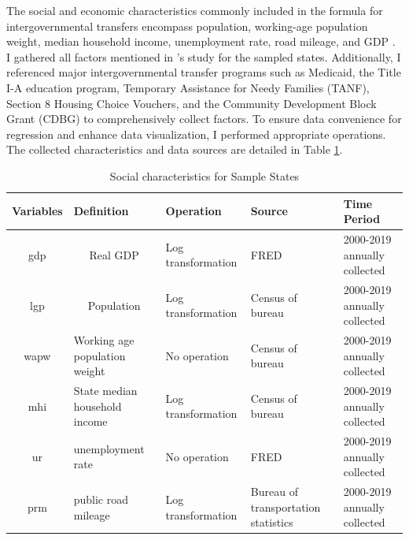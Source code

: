 \documentclass[man]{apa7}
\begin{document}
The social and economic characteristics commonly included in the formula for intergovernmental transfers encompass population, working-age population weight, median household income, unemployment rate, road mileage, and GDP \parencite{dilger2015federal}. I gathered all factors mentioned in \Textcite{dilger2015federal}'s study for the sampled states. Additionally, I referenced major intergovernmental transfer programs such as Medicaid, the Title I-A education program, Temporary Assistance for Needy Families (TANF), Section 8 Housing Choice Vouchers, and the Community Development Block Grant (CDBG) to comprehensively collect factors. To ensure data convenience for regression and enhance data visualization, I performed appropriate operations. The collected characteristics and data sources are detailed in Table \ref{Table 2.4}.%

\begin{table}
  \centering
  \caption{Social characteristics for Sample States}
  \begin{tabular}{cp{6.43em}p{9.285em}p{5.855em}p{5.355em}}
    \toprule
    \multicolumn{1}{p{4em}}{Variables } & Definition                      & Operation          & Source                              & Time Period                  \\
    \midrule
    gdp                                 & \multicolumn{1}{c}{Real GDP}    & Log transformation & FRED                                & 2000-2019 annually collected \\
    \midrule
    lgp                                 & \multicolumn{1}{c}{Population } & Log transformation & Census of bureau                    & 2000-2019 annually collected \\
    \midrule
    wapw                                & Working age population weight   & No operation       & Census of bureau                    & 2000-2019 annually collected \\
    \midrule
    mhi                                 & State median household income   & Log transformation & Census of bureau                    & 2000-2019 annually collected \\
    \midrule
    ur                                  & unemployment rate               & No operation       & FRED                                & 2000-2019 annually collected \\
    \midrule
    prm                                 & public road mileage             & Log transformation & Bureau of transportation statistics & 2000-2019 annually collected \\
    \bottomrule
  \end{tabular}%
  \label{Table 2.4}%
\end{table}%
\end{document}
